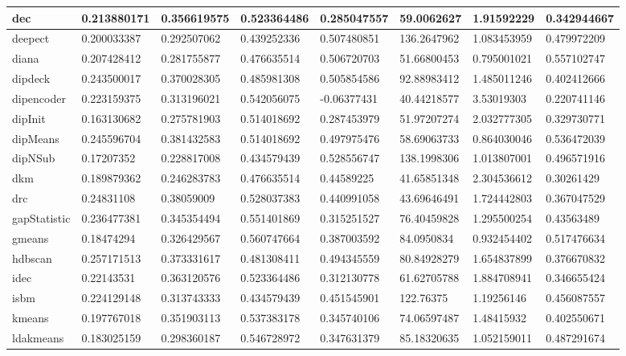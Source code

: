 \begin{table}[H]
\begin{tabular}{|l|l|l|l|l|l|l|l|}
\hline
dec & 0.213880171 & 0.356619575 & 0.523364486 & 0.285047557 & 59.0062627 & 1.91592229 & 0.342944667 \\
\hline
deepect & 0.200033387 & 0.292507062 & 0.439252336 & 0.507480851 & 136.2647962 & 1.083453959 & 0.479972209 \\
\hline
diana & 0.207428412 & 0.281755877 & 0.476635514 & 0.506720703 & 51.66800453 & 0.795001021 & 0.557102747 \\
\hline
dipdeck & 0.243500017 & 0.370028305 & 0.485981308 & 0.505854586 & 92.88983412 & 1.485011246 & 0.402412666 \\
\hline
dipencoder & 0.223159375 & 0.313196021 & 0.542056075 & -0.06377431 & 40.44218577 & 3.53019303 & 0.220741146 \\
\hline
dipInit & 0.163130682 & 0.275781903 & 0.514018692 & 0.287453979 & 51.97207274 & 2.032777305 & 0.329730771 \\
\hline
dipMeans & 0.245596704 & 0.381432583 & 0.514018692 & 0.497975476 & 58.69063733 & 0.864030046 & 0.536472039 \\
\hline
dipNSub & 0.17207352 & 0.228817008 & 0.434579439 & 0.528556747 & 138.1998306 & 1.013807001 & 0.496571916 \\
\hline
dkm & 0.189879362 & 0.246283783 & 0.476635514 & 0.44589225 & 41.65851348 & 2.304536612 & 0.30261429 \\
\hline
drc & 0.24831108 & 0.38059009 & 0.528037383 & 0.440991058 & 43.69646491 & 1.724442803 & 0.367047529 \\
\hline
gapStatistic & 0.236477381 & 0.345354494 & 0.551401869 & 0.315251527 & 76.40459828 & 1.295500254 & 0.43563489 \\
\hline
gmeans & 0.18474294 & 0.326429567 & 0.560747664 & 0.387003592 & 84.0950834 & 0.932454402 & 0.517476634 \\
\hline
hdbscan & 0.257171513 & 0.373331617 & 0.481308411 & 0.494345559 & 80.84928279 & 1.654837899 & 0.376670832 \\
\hline
idec & 0.22143531 & 0.363120576 & 0.523364486 & 0.312130778 & 61.62705788 & 1.884708941 & 0.346655424 \\
\hline
isbm & 0.224129148 & 0.313743333 & 0.434579439 & 0.451545901 & 122.76375 & 1.19256146 & 0.456087557 \\
\hline
kmeans & 0.197767018 & 0.351903113 & 0.537383178 & 0.345740106 & 74.06597487 & 1.48415932 & 0.402550671 \\
\hline
ldakmeans & 0.183025159 & 0.298360187 & 0.546728972 & 0.347631379 & 85.18320635 & 1.052159011 & 0.487291674 \\

\end{tabular}
\end{table}
